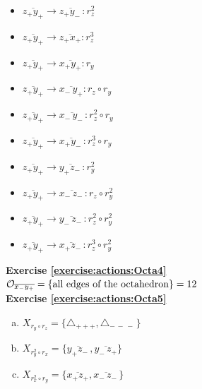 \begin{enumerate}[(a)]
\begin{multicols}{2}
\begin{itemize}
	\item
	$\overline{z_+y_+} \rightarrow \overline{z_+y_-\,}: r_z^2$
	
	\item
	$\overline{z_+y_+} \rightarrow \overline{z_+x_+}: r_z^3$
	
	\item
	$\overline{z_+y_+} \rightarrow \overline{x_+y_+}: r_y$
	
	\item
	$\overline{z_+y_+} \rightarrow \overline{x_-\,y_+}: r_z \circ r_y$
	
	\item
	$\overline{z_+y_+} \rightarrow \overline{x_-\,y_-\,}: r_z^2 \circ r_y$
	
	\item
	$\overline{z_+y_+} \rightarrow \overline{x_+y_-\,}: r_z^3 \circ r_y$
	
	\item
	$\overline{z_+y_+} \rightarrow \overline{y_+z_-\,}: r_y^2$
	
	\item
	$\overline{z_+y_+} \rightarrow \overline{x_-\,z_-\,}: r_z \circ r_y^2$
	
	\item
	$\overline{z_+y_+} \rightarrow \overline{y_-\,z_-\,}: r_z^2 \circ r_y^2$
	
	\item
	$\overline{z_+y_+} \rightarrow \overline{x_+z_-\,}: r_z^3 \circ r_y^2$
	\end{itemize}
	\end{multicols}
\end{enumerate}

\noindent\textbf{Exercise \ref{exercise:actions:Octa4}}
\\
${\cal O}_{\overline{x_-y_+}} = \{\text{all edges of the octahedron}\} = 12$
\\

\noindent\textbf{Exercise \ref{exercise:actions:Octa5}}
\begin{enumerate}[(a)]
\item 
$X_{r_{y}\circ r_{z}}= \{\triangle_{ +++}, \triangle_{-\,-\,-\,}\}$

\item 
$X_{r_{y}^2\circ r_{x}}=\{\overline {y_+z_-\,},\overline{y_-\,z_+}\}$

\item
$X_{r_{x}^2\circ r_{y}}=\{\overline {x_+z_+},\overline{x_-\,z_-\,}\}$ 
\end{enumerate}

